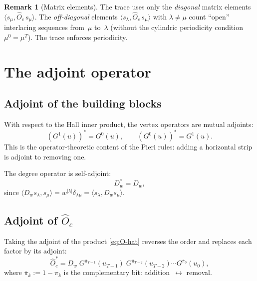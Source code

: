 \documentclass[11pt]{article}
\theoremstyle{plain}
\theoremstyle{definition}
\newtheorem{remark}[theorem]{Remark}
\begin{document}
\begin{remark}[Matrix elements]
\label{rem:matrix-elements}
The trace uses only the \emph{diagonal} matrix elements
$\langle s_\mu, \hat{O}_c\, s_\mu \rangle$.
The \emph{off-diagonal} elements
$\langle s_\lambda, \hat{O}_c\, s_\mu \rangle$ with
$\lambda \neq \mu$ count ``open'' interlacing sequences from~$\mu$
to~$\lambda$ (without the cylindric periodicity condition
$\mu^0 = \mu^T$).  The trace enforces periodicity.
\end{remark}


\section{The adjoint operator}
\label{sec:adjoint}

\subsection{Adjoint of the building blocks}

With respect to the Hall inner product, the vertex operators are
mutual adjoints:
\begin{equation}\label{eq:G-adjoint}
  (G^1(u))^* = G^0(u), \qquad (G^0(u))^* = G^1(u).
\end{equation}
This is the operator-theoretic content of the Pieri rules: adding a
horizontal strip is adjoint to removing one.

The degree operator is self-adjoint:
\begin{equation}\label{eq:Dw-adjoint}
  D_w^* = D_w,
\end{equation}
since $\langle D_w s_\lambda, s_\mu \rangle
= w^{|\lambda|} \delta_{\lambda\mu}
= \langle s_\lambda, D_w s_\mu \rangle$.

\subsection{Adjoint of $\hat{O}_c$}

Taking the adjoint of the product \eqref{eq:O-hat} reverses the
order and replaces each factor by its adjoint:
\begin{equation}\label{eq:O-adjoint}
  \hat{O}_c^*
  = D_w\; G^{\bar\pi_{T-1}}(u_{T-1})\;
    G^{\bar\pi_{T-2}}(u_{T-2}) \cdots G^{\bar\pi_0}(u_0),
\end{equation}
where $\bar\pi_k := 1 - \pi_k$ is the complementary bit:
addition~$\leftrightarrow$ removal.
\end{document}

